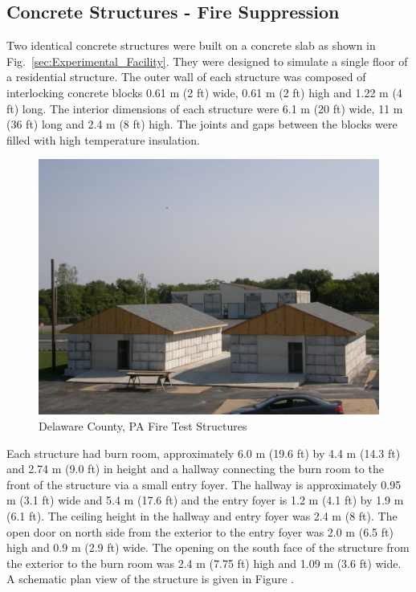 \documentclass[12pt,oneside]{book}
\begin{document}
\subsection{Concrete Structures - Fire Suppression}
\label{sec:Experimental Structures}

Two identical concrete structures were built on a concrete slab as shown in Fig.~\ref{sec:Experimental_Facility}. They were designed to simulate a single floor of a residential structure.  The outer wall of each structure was composed of interlocking concrete blocks 0.61 m (2 ft) wide, 0.61 m (2 ft) high and 1.22 m (4 ft) long.  The interior dimensions of each structure were 6.1 m (20 ft) wide, 11 m (36 ft) long and 2.4 m (8 ft) high.  The joints and gaps between the blocks were filled with high temperature insulation.

\begin{figure}[!ht]
	\includegraphics[width=6in]{../Figures/Pictures/DelCo_Structures}
	\caption{Delaware County, PA Fire Test Structures}
	\label{fig:Delaware_County,_PA_Fire_Test_Structures}
\end{figure}

Each structure had burn room, approximately 6.0 m (19.6 ft) by 4.4 m (14.3 ft) and 2.74 m (9.0 ft) in height and a hallway connecting the burn room to the front of the structure via a small entry foyer.  The hallway is approximately 0.95 m (3.1 ft) wide and 5.4 m (17.6 ft) and the entry foyer is 1.2 m (4.1 ft) by 1.9 m (6.1 ft).  The ceiling height in the hallway and entry foyer was 2.4 m (8 ft).  The open door on north side from the exterior to the entry foyer was 2.0 m (6.5 ft) high and 0.9 m (2.9 ft) wide.  The opening on the south face of the structure from the exterior to the burn room was 2.4 m (7.75 ft) high and 1.09 m (3.6 ft) wide.   A schematic plan view of the structure is given in Figure     .    
\end{document}
